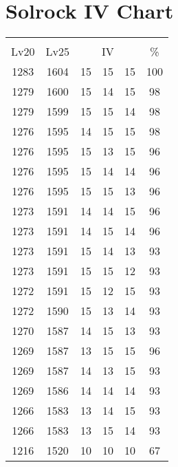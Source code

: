 \documentclass{article}%
\begin{document}
%
\normalsize%
\section{Solrock IV Chart}%
\label{sec:Solrock IV Chart}%
\renewcommand{\arraystretch}{1.5}%
\begin{tabular}{|c|c|c|c|c|c|}%
\hline%
\multicolumn{6}{|c|}{\textcolor{white}{ 
\linebreak{Solrock}
}%
\cellcolor{black}}\\%
\multicolumn{1}{|c}{Lv20}&\multicolumn{1}{c|}{Lv25}&\multicolumn{3}{c|}{IV}&\multicolumn{1}{|c|}{\%}\\%
\hline%
\rowcolor{color100}%
1283&1604&15&15&15&100\\%
\hline%
\rowcolor{color98}%
1279&1600&15&14&15&98\\%
\hline%
\rowcolor{color98}%
1279&1599&15&15&14&98\\%
\hline%
\rowcolor{color98}%
1276&1595&14&15&15&98\\%
\hline%
\rowcolor{color96}%
1276&1595&15&13&15&96\\%
\hline%
\rowcolor{color96}%
1276&1595&15&14&14&96\\%
\hline%
\rowcolor{color96}%
1276&1595&15&15&13&96\\%
\hline%
\rowcolor{color96}%
1273&1591&14&14&15&96\\%
\hline%
\rowcolor{color96}%
1273&1591&14&15&14&96\\%
\hline%
\rowcolor{color93}%
1273&1591&15&14&13&93\\%
\hline%
\rowcolor{color93}%
1273&1591&15&15&12&93\\%
\hline%
\rowcolor{color93}%
1272&1591&15&12&15&93\\%
\hline%
\rowcolor{color93}%
1272&1590&15&13&14&93\\%
\hline%
\rowcolor{color93}%
1270&1587&14&15&13&93\\%
\hline%
\rowcolor{color96}%
1269&1587&13&15&15&96\\%
\hline%
\rowcolor{color93}%
1269&1587&14&13&15&93\\%
\hline%
\rowcolor{color93}%
1269&1586&14&14&14&93\\%
\hline%
\rowcolor{color93}%
1266&1583&13&14&15&93\\%
\hline%
\rowcolor{color93}%
1266&1583&13&15&14&93\\%
\hline%
\rowcolor{color91}%
1216&1520&10&10&10&67\\%
\end{tabular}

%
\end{document}
